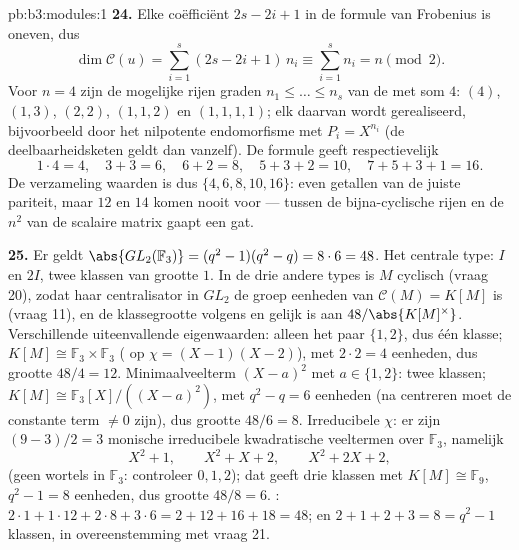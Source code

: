 \begin{solution}{pb:b3:modules:1}
\textbf{24.} Elke coëfficiënt $2s - 2i + 1$ in de formule van
Frobenius is oneven, dus
\[
\dim\mathcal C(u) = \sum_{i=1}^s(2s - 2i + 1)\,n_i
\equiv \sum_{i=1}^s n_i = n \pmod 2 .
\]
Voor $n = 4$ zijn de mogelijke rijen graden $n_1 \leq \dots \leq
n_s$ van de  met som $4$: $(4)$, $(1, 3)$, $(2,
2)$, $(1, 1, 2)$ en $(1, 1, 1, 1)$; elk daarvan wordt
gerealiseerd, bijvoorbeeld door het nilpotente endomorfisme met
$P_i = X^{n_i}$ (de deelbaarheidsketen geldt dan vanzelf). De
formule geeft respectievelijk
\[
1\cdot4 = 4, \quad 3 + 3 = 6, \quad 6 + 2 = 8, \quad
5 + 3 + 2 = 10, \quad 7 + 5 + 3 + 1 = 16 .
\]
De verzameling waarden is dus $\{4, 6, 8, 10, 16\}$: even getallen
van de juiste pariteit, maar $12$ en $14$ komen nooit voor ---
tussen de bijna-cyclische rijen en de $n^2$ van de scalaire matrix
gaapt een gat.

\textbf{25.} Er geldt $\abs{GL_2(\mathbb F_3)} = (q^2 - 1)(q^2 -
q) = 8 \cdot 6 = 48$. Het centrale type: $I$ en $2I$, twee klassen
van grootte $1$. In de drie andere types is $M$ cyclisch (vraag
20), zodat haar centralisator in $GL_2$ de groep eenheden van
$\mathcal C(M) = K[M]$ is (vraag 11), en de klassegrootte volgens
 en  gelijk is aan $48/\abs{K[M]^\times}$.
Verschillende uiteenvallende eigenwaarden: alleen het paar $\{1,
2\}$, dus één klasse; $K[M] \cong \mathbb F_3 \times \mathbb F_3$
( op $\chi = (X-1)(X-2)$), met $2 \cdot 2 = 4$
eenheden, dus grootte $48/4 = 12$. Minimaalveelterm $(X - a)^2$
met $a \in \{1, 2\}$: twee klassen; $K[M] \cong \mathbb
F_3[X]/((X-a)^2)$, met $q^2 - q = 6$ eenheden (na centreren moet
de constante term $\neq 0$ zijn), dus grootte $48/6 = 8$.
Irreducibele $\chi$: er zijn $(9 - 3)/2 = 3$ monische irreducibele
kwadratische veeltermen over $\mathbb F_3$, namelijk
\[
X^2 + 1, \qquad X^2 + X + 2, \qquad X^2 + 2X + 2,
\]
(geen wortels in $\mathbb F_3$: controleer $0, 1, 2$); dat geeft
drie klassen met $K[M] \cong \mathbb F_9$, $q^2 - 1 = 8$
eenheden, dus grootte $48/8 = 6$. : $2\cdot1 +
1\cdot12 + 2\cdot8 + 3\cdot6 = 2 + 12 + 16 + 18 = 48$; en $2 + 1 +
2 + 3 = 8 = q^2 - 1$ klassen, in overeenstemming met vraag 21.
\end{solution}
